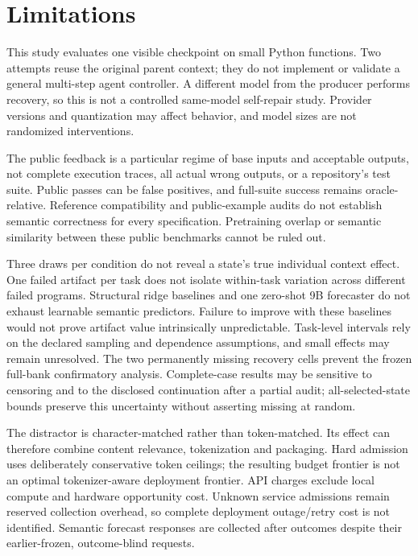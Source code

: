 \documentclass[10pt,twocolumn]{article}
\begin{document}
\section{Limitations}

This study evaluates one visible checkpoint on small Python functions.
Two attempts reuse the original parent context; they do not implement or
validate a general multi-step agent controller. A different model from the
producer performs recovery, so this is not a controlled same-model self-repair
study. Provider versions and quantization may affect behavior, and model sizes
are not randomized interventions.

The public feedback is a particular regime of base inputs and acceptable outputs,
not complete execution traces, all actual wrong outputs, or a repository's test
suite. Public passes can be false positives, and full-suite success remains
oracle-relative. Reference compatibility and public-example audits do not
establish semantic correctness for every specification. Pretraining overlap or
semantic similarity between these public benchmarks cannot be ruled out.

Three draws per condition do not reveal a state's true individual context effect.
One failed artifact per task does not isolate within-task variation across
different failed programs. Structural ridge baselines and one zero-shot 9B
forecaster do not exhaust learnable semantic predictors. Failure to improve with
these baselines would not prove artifact value intrinsically unpredictable.
Task-level intervals rely on the declared sampling and dependence assumptions,
and small effects may remain unresolved. The two permanently missing recovery
cells prevent the frozen full-bank confirmatory analysis. Complete-case results
may be sensitive to censoring and to the disclosed continuation after a partial
audit; all-selected-state bounds preserve this uncertainty without asserting
missing at random.

The distractor is character-matched rather than token-matched. Its effect can
therefore combine content relevance, tokenization and packaging. Hard admission
uses deliberately conservative token ceilings; the resulting budget frontier
is not an optimal tokenizer-aware deployment frontier. API charges exclude
local compute and hardware opportunity cost. Unknown service admissions remain
reserved collection overhead, so complete deployment outage/retry cost is not
identified. Semantic forecast responses are collected after outcomes despite
their earlier-frozen, outcome-blind requests.
\end{document}
